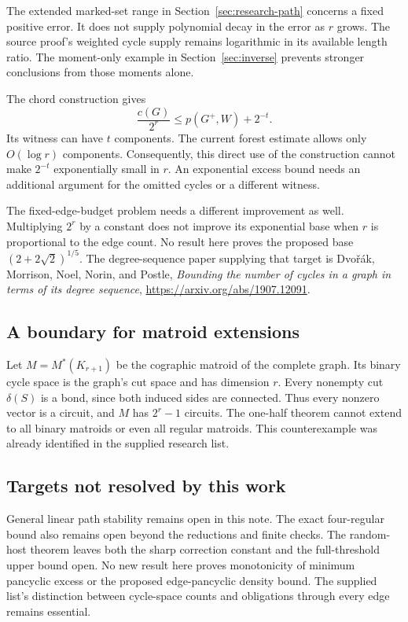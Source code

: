 The extended marked-set range in Section~\ref{sec:research-path} concerns a fixed positive error.
It does not supply polynomial decay in the error as $r$ grows.
The source proof's weighted cycle supply remains logarithmic in its available length ratio.
The moment-only example in Section~\ref{sec:inverse} prevents stronger conclusions from those moments alone.

The chord construction gives
\[
 \frac{c(G)}{2^r}\le p(G^+,W)+2^{-t}.
\]
Its witness can have $t$ components.
The current forest estimate allows only $O(\log r)$ components.
Consequently, this direct use of the construction cannot make $2^{-t}$ exponentially small in $r$.
An exponential excess bound needs an additional argument for the omitted cycles or a different witness.

The fixed-edge-budget problem needs a different improvement as well.
Multiplying $2^r$ by a constant does not improve its exponential base when $r$ is proportional to the edge count.
No result here proves the proposed base $(2+2\sqrt2)^{1/5}$.
The degree-sequence paper supplying that target is Dvo\v r\'ak, Morrison, Noel, Norin, and Postle,
\emph{Bounding the number of cycles in a graph in terms of its degree sequence},
\url{https://arxiv.org/abs/1907.12091}.

\subsection{A boundary for matroid extensions}

Let $M=M^*(K_{r+1})$ be the cographic matroid of the complete graph.
Its binary cycle space is the graph's cut space and has dimension $r$.
Every nonempty cut $\delta(S)$ is a bond, since both induced sides are connected.
Thus every nonzero vector is a circuit, and $M$ has $2^r-1$ circuits.
The one-half theorem cannot extend to all binary matroids or even all regular matroids.
This counterexample was already identified in the supplied research list.

\subsection{Targets not resolved by this work}

General linear path stability remains open in this note.
The exact four-regular bound also remains open beyond the reductions and finite checks.
The random-host theorem leaves both the sharp correction constant and the full-threshold upper bound open.
No new result here proves monotonicity of minimum pancyclic excess or the proposed edge-pancyclic density bound.
The supplied list's distinction between cycle-space counts and obligations through every edge remains essential.
